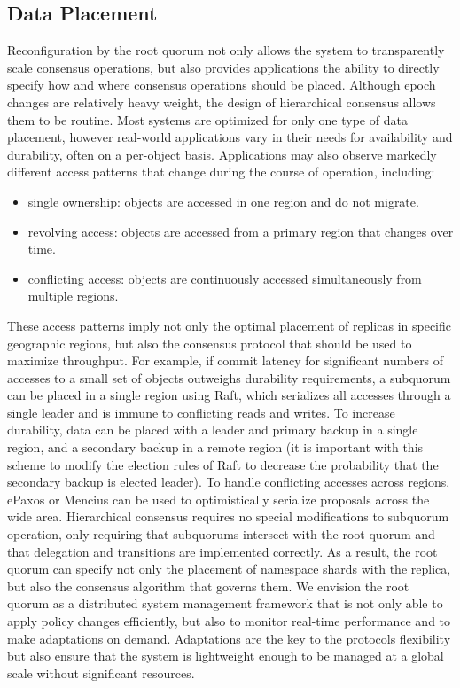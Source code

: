 \documentclass[10pt,conference]{IEEEtran}
\newcommand{\hc}{hierarchical consensus\xspace}
\newcommand{\Hc}{Hierarchical consensus\xspace}
\newcommand{\sub}{subquorum\xspace}
\newcommand{\subs}{subquorums\xspace}
\newcommand{\roo}{root quorum\xspace}
\begin{document}
\subsection{Data Placement}
\label{section:placement}


Reconfiguration by the \roo not only allows the system to transparently scale consensus
operations, but also provides applications the ability to directly specify how and where
consensus operations should be placed.
Although epoch changes are relatively heavy weight, the design of \hc allows them to be
routine.
Most systems are optimized for only one type of data placement, however real-world
applications vary in their needs for availability and durability, often on a per-object
basis.
Applications may also observe markedly different access patterns that change during the
course of operation, including:

\begin{itemize}
    \item single ownership: objects are accessed in one region and do not migrate.
    \item revolving access: objects are accessed from a primary region that changes over time.
    \item conflicting access: objects are continuously accessed simultaneously from multiple regions.
\end{itemize}

These access patterns imply not only the optimal placement of replicas in specific
geographic regions, but also the consensus protocol that should be used to maximize
throughput.
For example, if commit latency for significant numbers of accesses to a small set of
objects outweighs durability requirements, a \sub can be placed in a single region using
Raft, which serializes all accesses through a single leader and is immune to conflicting
reads and writes.
To increase durability, data can be placed with a leader and primary backup in a single
region, and a secondary backup in a remote region (it is important with this scheme to
modify the election rules of Raft to decrease the probability that the secondary backup
is elected leader).
To handle conflicting accesses across regions, ePaxos or Mencius can be used to
optimistically serialize proposals across the wide area.
\Hc requires no special modifications to \sub operation, only requiring that \subs
intersect with the \roo and that delegation and transitions are implemented correctly.
As a result, the \roo can specify not only the placement of namespace shards with the
replica, but also the consensus algorithm that governs them.
We envision the \roo as a distributed system management framework that is not only able
to apply policy changes efficiently, but also to monitor real-time performance and to
make adaptations on demand.
Adaptations are the key to the protocols flexibility but also ensure that the system is
lightweight enough to be managed at a global scale without significant resources.
\end{document}
